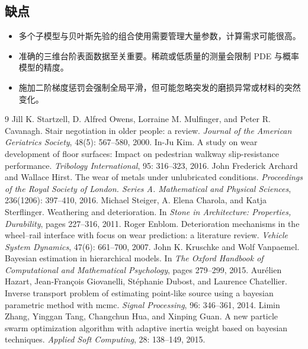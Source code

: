 \documentclass[11pt,a4paper,fontset=windows]{ctexart}
\begin{document}
\subsection{缺点}
\begin{itemize}
\item 多个子模型与贝叶斯先验的组合使用需要管理大量参数，计算需求可能很高。
\item 准确的三维台阶表面数据至关重要。稀疏或低质量的测量会限制 PDE 与概率模型的精度。
\item 施加二阶梯度惩罚会强制全局平滑，但可能忽略突发的磨损异常或材料的突然变化。
\end{itemize}

\newpage
\begingroup
\small
\begin{thebibliography}{9}
\setlength{\itemsep}{2pt}
 Jill K. Startzell, D. Alfred Owens, Lorraine M. Mulfinger, and Peter R. Cavanagh. Stair negotiation in older people: a review. \textit{Journal of the American Geriatrics Society}, 48(5): 567--580, 2000.
 In-Ju Kim. A study on wear development of floor surfaces: Impact on pedestrian walkway slip-resistance performance. \textit{Tribology International}, 95: 316--323, 2016.
 John Frederick Archard and Wallace Hirst. The wear of metals under unlubricated conditions. \textit{Proceedings of the Royal Society of London. Series A. Mathematical and Physical Sciences}, 236(1206): 397--410, 2016.
 Michael Steiger, A. Elena Charola, and Katja Sterflinger. Weathering and deterioration. In \textit{Stone in Architecture: Properties, Durability}, pages 227--316, 2011.
 Roger Enblom. Deterioration mechanisms in the wheel--rail interface with focus on wear prediction: a literature review. \textit{Vehicle System Dynamics}, 47(6): 661--700, 2007.
 John K. Kruschke and Wolf Vanpaemel. Bayesian estimation in hierarchical models. In \textit{The Oxford Handbook of Computational and Mathematical Psychology}, pages 279--299, 2015.
 Aur\'elien Hazart, Jean-Fran\c{c}ois Giovanelli, St\'ephanie Dubost, and Laurence Chatellier. Inverse transport problem of estimating point-like source using a bayesian parametric method with mcmc. \textit{Signal Processing}, 96: 346--361, 2014.
 Limin Zhang, Yinggan Tang, Changchun Hua, and Xinping Guan. A new particle swarm optimization algorithm with adaptive inertia weight based on bayesian techniques. \textit{Applied Soft Computing}, 28: 138--149, 2015.
\end{thebibliography}
\endgroup
\end{document}
